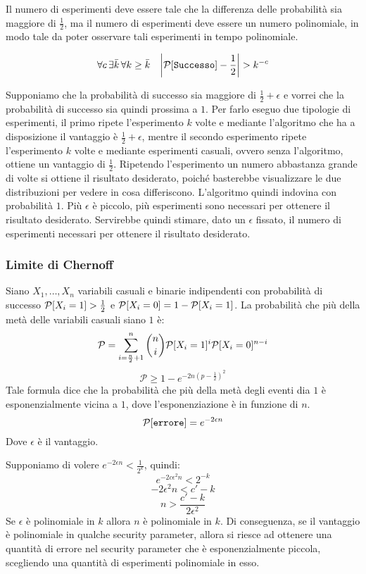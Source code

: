 Il numero di esperimenti deve essere tale che la differenza delle probabilità sia
maggiore di $\frac{1}{2}$, ma il numero di esperimenti deve essere un numero 
polinomiale, in modo tale da poter osservare tali esperimenti in tempo polinomiale.
\begin{tcolorbox}[title = Sicurezza]
  \begin{equation}
    \forall c \, \exists \bar{k} \, \forall k \geq \bar{k} \quad \bigg| \text{$\mathcal{P}$}[\texttt{Successo}] - \frac{1}{2}  \bigg|  > k^{-c}
  \end{equation}
\end{tcolorbox}
Supponiamo che la probabilità di successo sia maggiore di $\frac{1}{2} + \epsilon$ e vorrei che la probabilità di successo sia quindi 
prossima a $1$. Per farlo eseguo due tipologie di esperimenti, il primo ripete l'esperimento $k$ volte e mediante l'algoritmo che 
ha a disposizione il vantaggio è $\frac{1}{2} + \epsilon$, mentre il secondo esperimento ripete l'esperimento $k$ volte e mediante
esperimenti casuali, ovvero senza l'algoritmo, ottiene un vantaggio di $\frac{1}{2}$. Ripetendo l'esperimento un numero abbastanza grande di 
volte si ottiene il risultato desiderato, poiché basterebbe visualizzare le due distribuzioni per vedere in cosa differiscono. L'algoritmo 
quindi indovina con probabilità $1$. Più $\epsilon$ è piccolo, più esperimenti sono necessari per ottenere il risultato desiderato. 
Servirebbe quindi stimare, dato un $\epsilon$ fissato, il numero di esperimenti necessari per ottenere il risultato desiderato.
\subsubsection{Limite di Chernoff} \label{limite_chernoff}
\begin{tcolorbox}[title = Limite di Chernoff]
  Siano $X_1, \dots, X_n$ variabili casuali e binarie indipendenti con probabilità 
  di successo $\text{$\mathcal{P}$}[X_i = 1] > \frac{1}{2}$ e $\text{$\mathcal{P}$}[X_i = 0] = 1 - \text{$\mathcal{P}$}[X_i = 1]$.
  La probabilità che più della metà delle variabili casuali siano $1$ è:
  \[
    \mathcal{P} = \sum_{i = \frac{n}{2} + 1}^n \binom{n}{i} \text{$\mathcal{P}$}[X_i = 1]^i \text{$\mathcal{P}$}[X_i = 0]^{n - i}
  \]
  \[
    \mathcal{P} \geq 1 - e^{-2n\left(p - \frac{1}{2}\right)^2}
  \]
  Tale formula dice che la probabilità che più della metà degli eventi dia $1$ è 
  esponenzialmente vicina a $1$, dove l'esponenziazione è in funzione di $n$.
  \[
    \text{$\mathcal{P}$}[\texttt{errore}] = e^{-2 \epsilon n}
  \]
  Dove $\epsilon$ è il vantaggio.
\end{tcolorbox}
Supponiamo di volere $e^{-2 \epsilon n} < \frac{1}{2^k}$, quindi:
\[
  e^{-2c\epsilon^2 n} < 2^{-k}
\]
\[
  -2\epsilon^2 n < c' - k 
\]
\[
  n > \frac{c' - k}{2\epsilon^2}
\]
Se $\epsilon$ è polinomiale in $k$ allora $n$ è polinomiale in $k$.
Di conseguenza, se il vantaggio è polinomiale in qualche security parameter, allora
si riesce ad ottenere una quantità di errore nel security parameter che è
esponenzialmente piccola, scegliendo una quantità di esperimenti polinomiale in esso.

